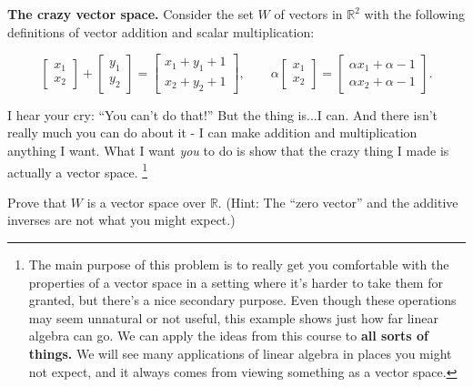 
	\question \textbf{The crazy vector space.} Consider the set $W$ of vectors in $\mathbb{R}^2$ with the following definitions of vector addition and scalar multiplication:
	
	\[ \begin{bmatrix}
			x_1 \\ x_2
		\end{bmatrix} +
		\begin{bmatrix}
			y_1 \\ y_2
		\end{bmatrix}
		=
		\begin{bmatrix}
			x_1 + y_1 + 1 \\ x_2 + y_2 + 1
		\end{bmatrix}, \qquad
		\alpha\begin{bmatrix}
			x_1 \\ x_2
		\end{bmatrix} =
		\begin{bmatrix}
			\alpha x_1+\alpha -1 \\ \alpha x_2+\alpha -1
		\end{bmatrix}. \]
		
		I hear your cry: ``You can't do that!'' But the thing is...I can. And there isn't really much you can do about it - I can make addition and multiplication anything I want. What I want \textit{you} to do is show that the crazy thing I made is actually a vector space. \footnote{The main purpose of this problem is to really get you comfortable with the properties of a vector space in a setting where it's harder to take them for granted, but there's a nice secondary purpose. Even though these operations may seem unnatural or not useful, this example shows just how far linear algebra can go. We can apply the ideas from this course to \textbf{all sorts of things.} We will see many applications of linear algebra in places you might not expect, and it always comes from viewing something as a vector space.}
		
		
		Prove that $W$ is a vector space over $\mathbb{R}$. (Hint: The ``zero vector'' and the additive inverses are not what you might expect.)
		
